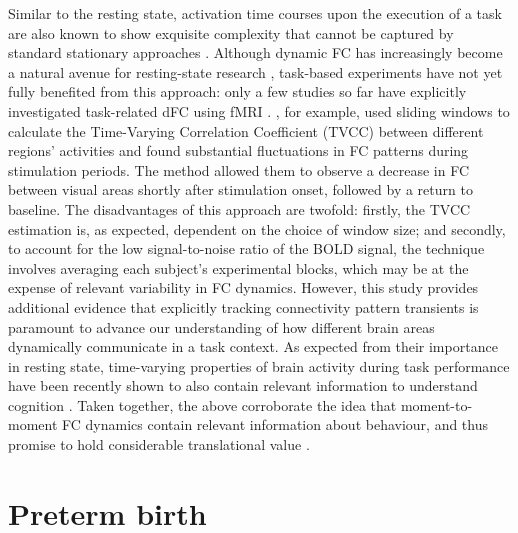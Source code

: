 Similar to the resting state, activation time courses upon the execution of a task are also known to show exquisite complexity that cannot be captured by standard stationary approaches \citep{Gonzalez-Castillo2018}. Although dynamic FC has increasingly become a natural avenue for resting-state research \citep{Preti2017}, task-based experiments have not yet fully benefited from this approach: only a few studies so far have explicitly investigated task-related dFC using fMRI \cite{Braun2015, Di2015, Simony2016}. \cite{Di2015}, for example, used sliding windows to calculate the Time-Varying Correlation Coefficient (TVCC) between different regions’ activities and found substantial fluctuations in FC patterns during stimulation periods. The method allowed them to observe a decrease in FC between visual areas shortly after stimulation onset, followed by a return to baseline. The disadvantages of this approach are twofold: firstly, the TVCC estimation is, as expected, dependent on the choice of window size; and secondly, to account for the low signal-to-noise ratio of the BOLD signal, the technique involves averaging each subject’s experimental blocks, which may be at the expense of relevant variability in FC dynamics. However, this study provides additional evidence that explicitly tracking connectivity pattern transients is paramount to advance our understanding of how different brain areas dynamically communicate in a task context. As expected from their importance in resting state, time-varying properties of brain activity during task performance have been recently shown to also contain relevant information to understand cognition \citep{Fong2019}. Taken together, the above corroborate the idea that moment-to-moment FC dynamics contain relevant information about behaviour, and thus promise to hold considerable translational value \citep{ Gonzalez-Castillo2018}.


\section{Preterm birth}\label{sub:preterm}

